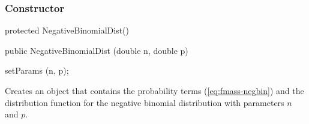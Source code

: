 \subsubsection* {Constructor}
\begin{code}
\begin{hide}
   protected NegativeBinomialDist() {}

\end{hide}

   public NegativeBinomialDist (double n, double p)\begin{hide} {
      setParams (n, p);
   }\end{hide}
\end{code}
 \begin{tabb}
   Creates an object that contains the probability
   terms (\ref{eq:fmass-negbin}) and the distribution function for
   the negative binomial distribution with parameters $n$ and $p$.
 \end{tabb}


